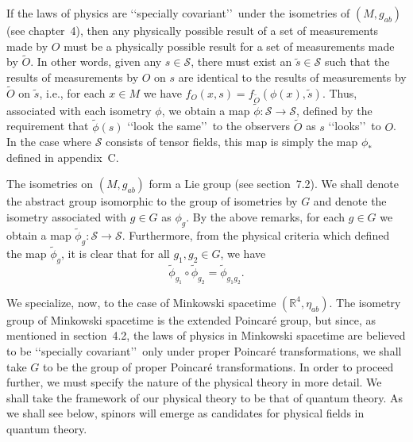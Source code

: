 If the laws of physics are \lq\lq specially covariant\rq\rq\ under the isometries of
\((M,g_{ab})\) (see chapter~4), then any physically possible result of a set of
measurements made by \(O\) must be a physically possible result for a set of
measurements made by \(\widetilde O\). In other words, given any
\(s\in\mathcal S\), there must exist an \(\widetilde s\in\mathcal S\) such that the
results of measurements by \(O\) on \(s\) are identical to the results of
measurements by \(\widetilde O\) on \(\widetilde s\), i.e., for each \(x\in M\) we
have \(f_O(x,s)=f_{\widetilde O}(\phi(x),\widetilde s)\). Thus, associated with each
isometry \(\phi\), we obtain a map \(\widetilde\phi:\mathcal S\longrightarrow
\mathcal S\), defined by the requirement that \(\widetilde\phi(s)\)
\lq\lq look the same\rq\rq\ to the observers \(\widetilde O\) as \(s\)
\lq\lq looks\rq\rq\ to \(O\). In the case where \(\mathcal S\) consists of tensor
fields, this map is simply the map \(\phi_*\) defined in appendix~C.

The isometries on \((M,g_{ab})\) form a Lie group (see section~7.2). We shall denote
the abstract group isomorphic to the group of isometries by \(G\) and denote the
isometry associated with \(g\in G\) as \(\phi_g\). By the above remarks, for each
\(g\in G\) we obtain a map \(\widetilde\phi_g:\mathcal S\longrightarrow\mathcal S\).
Furthermore, from the physical criteria which defined the map
\(\widetilde\phi_g\), it is clear that for all \(g_1,g_2\in G\), we have
\begin{equation}
  \widetilde\phi_{g_1}\circ\widetilde\phi_{g_2}
  =\widetilde\phi_{g_1g_2}.
  \tag{13.1.1}\label{eq:13.1.1}
\end{equation}

We specialize, now, to the case of Minkowski spacetime
\((\mathbb R^4,\eta_{ab})\). The isometry group of Minkowski spacetime is the
extended Poincar\'e group, but since, as mentioned in section~4.2, the laws of
physics in Minkowski spacetime are believed to be \lq\lq specially covariant\rq\rq\
only under proper Poincar\'e transformations, we shall take \(G\) to be the group of
proper Poincar\'e transformations. In order to proceed further, we must specify the
nature of the physical theory in more detail. We shall take the framework of our
physical theory to be that of quantum theory. As we shall see below, spinors will
emerge as candidates for physical fields in quantum theory.

